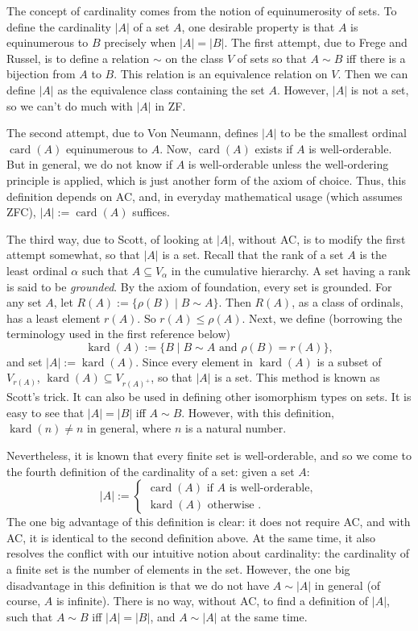\documentclass[12pt]{article}
\newcommand{\card}{\operatorname{card}}
\newcommand{\kard}{\operatorname{kard}}
\begin{document}
The concept of cardinality comes from the notion of equinumerosity of sets.  To define the cardinality $|A|$ of a set $A$, one desirable property is that $A$ is equinumerous to $B$ precisely when $|A|=|B|$.  The first attempt, due to Frege and Russel, is to define a relation $\sim$ on the class $V$ of sets so that $A\sim B$ iff there is a bijection from $A$ to $B$.  This relation is an equivalence relation on $V$.  Then we can define $|A|$ as the equivalence class containing the set $A$.  However, $|A|$ is not a set, so we can't do much with $|A|$ in ZF.

The second attempt, due to Von Neumann, defines $|A|$ to be the smallest ordinal $\card(A)$ equinumerous to $A$.  Now, $\card(A)$ exists if $A$ is well-orderable.  But in general, we do not know if $A$ is well-orderable unless the well-ordering principle is applied, which is just another form of the axiom of choice.  Thus, this definition depends on AC, and, in everyday mathematical usage (which assumes ZFC), $|A|:=\card(A)$ suffices.

The third way, due to Scott, of looking at $|A|$, without AC, is to modify the first attempt somewhat, so that $|A|$ is a set.  Recall that the rank of a set $A$ is the least ordinal $\alpha$ such that $A\subseteq V_{\alpha}$ in the cumulative hierarchy.  A set having a rank is said to be \emph{grounded}.  By the axiom of foundation, every set is grounded.  For any set $A$, let $R(A):=\lbrace \rho(B)\mid B\sim A\rbrace$.  Then $R(A)$, as a class of ordinals, has a least element $r(A)$.  So $r(A)\le \rho(A)$.  Next, we define (borrowing the terminology used in the first reference below) $$\kard(A):=\lbrace B \mid B\sim A\mbox{ and }\rho(B)=r(A)\rbrace,$$ and set $|A|:=\kard(A)$.  Since every element in $\kard(A)$ is a subset of $V_{r(A)}$, $\kard(A)\subseteq V_{r(A)^+}$, so that $|A|$ is a set.  This method is known as Scott's trick.  It can also be used in defining other isomorphism types on sets.  It is easy to see that $|A|=|B|$ iff $A\sim B$.  However, with this definition, $\kard(n)\ne n$ in general, where $n$ is a natural number.

Nevertheless, it is known that every finite set is well-orderable, and so we come to the fourth definition of the cardinality of a set: given a set $A$:
\begin{displaymath}
|A|:= \left\{
\begin{array}{ll}
\card(A) \mbox{ if }A\mbox{ is well-orderable},\\
\kard(A) \mbox{ otherwise }.
\end{array}
\right.
\end{displaymath}
The one big advantage of this definition is clear: it does not require AC, and with AC, it is identical to the second definition above.  At the same time, it also resolves the conflict with our intuitive notion about cardinality: the cardinality of a finite set is the number of elements in the set.  However, the one big disadvantage in this definition is that we do not have $A\sim |A|$ in general (of course, $A$ is infinite).  There is no way, without AC, to find a definition of $|A|$, such that $A\sim B$ iff $|A|=|B|$, and $A\sim |A|$ at the same time.
\end{document}
